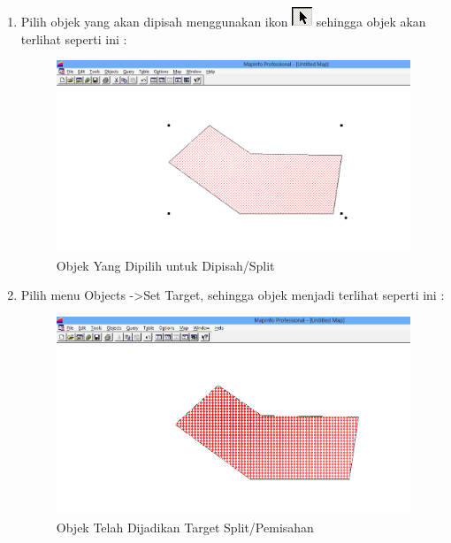\begin{enumerate}[\bfseries A.]
\begin{enumerate}[1.]
    \item Pilih objek yang akan dipisah menggunakan ikon \includegraphics{./resources/008-ikon-select} sehingga objek akan terlihat seperti ini :
    
    \begin{figure}[H]
      \centering
      \includegraphics[width=1\textwidth]{./resources/018-objek-terpilih-untuk-split}
      \caption{Objek Yang Dipilih untuk Dipisah/Split}
    \end{figure} 
    
    \item Pilih menu Objects -\textgreater Set Target, sehingga objek menjadi terlihat seperti ini :
    
    \begin{figure}[H]
      \centering
      \includegraphics[width=1\textwidth]{./resources/019-objek-terpilih-set-target}
      \caption{Objek Telah Dijadikan Target Split/Pemisahan}
    \end{figure}
    

\end{enumerate}
\end{enumerate}
